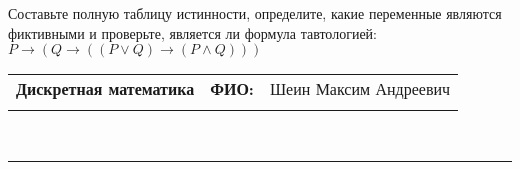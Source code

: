 \documentclass[10pt]{exam}
\newcommand{\class}{Дискретная математика}
\newcommand{\examdate}{}
\begin{document}
\begin{questions}
\begin{enumerate}[a)]
\end{enumerate}\question Составьте полную таблицу истинности, определите, какие переменные являются фиктивными и проверьте, является ли формула тавтологией:
$ P \rightarrow (Q \rightarrow ((P \lor Q) \rightarrow (P \land Q)))$

\end{questions}
\newpage
\begin{flushright}
\begin{tabular}{p{2.8in} r l}
\textbf{\class} & \textbf{ФИО:} &Шеин Максим Андреевич
\\

\textbf{\examdate} &&\\
\end{tabular}\\
\end{flushright}
\rule[1ex]{\textwidth}{.1pt}
\end{document}
